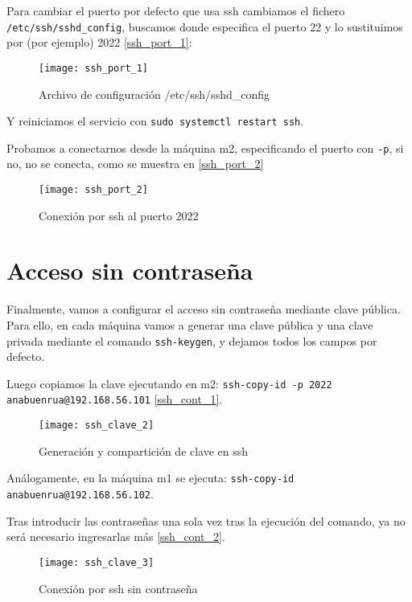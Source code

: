 Para cambiar el puerto por defecto que usa ssh cambiamos el fichero \verb|/etc/ssh/sshd_config|, buscamos donde especifica el puerto 22 y lo sustituimos por (por ejemplo) 2022 \eqref{ssh_port_1}:

\begin{figure}[h!]
\begin{center}
\caption{Archivo de configuración /etc/ssh/sshd\_config}
\label{ssh_port_1}
\texttt{[image: ssh\_port\_1]}
\end{center}
\end{figure}

Y reiniciamos el servicio con \verb|sudo systemctl restart ssh|.

Probamos a conectarnos desde la máquina m2, especificando el puerto con \verb|-p|, si no, no se conecta, como se muestra en \eqref{ssh_port_2}

\begin{figure}[h!]
\begin{center}
\caption{Conexión por ssh al puerto 2022}
\label{ssh_port_2}
\texttt{[image: ssh\_port\_2]}
\end{center}
\end{figure}

\section{Acceso sin contraseña}

Finalmente, vamos a configurar el acceso sin contraseña mediante clave pública. Para ello, en cada máquina vamos a generar una clave pública y una clave privada mediante el comando \verb|ssh-keygen|, y dejamos todos los campos por defecto.

Luego copiamos la clave ejecutando en m2: \verb|ssh-copy-id -p 2022 anabuenrua@192.168.56.101| \eqref{ssh_cont_1}.

\begin{figure}[h!]
\begin{center}
\caption{Generación y compartición de clave en ssh}
\label{ssh_cont_1}
\texttt{[image: ssh\_clave\_2]}
\end{center}
\end{figure}

Análogamente, en la máquina m1 se ejecuta: \verb|ssh-copy-id anabuenrua@192.168.56.102|.

Tras introducir las contraseñas una sola vez tras la ejecución del comando, ya no será necesario ingresarlas más \eqref{ssh_cont_2}.

\begin{figure}[h!]
\begin{center}
\caption{Conexión por ssh sin contraseña}
\label{ssh_cont_2}
\texttt{[image: ssh\_clave\_3]}
\end{center}
\end{figure}

